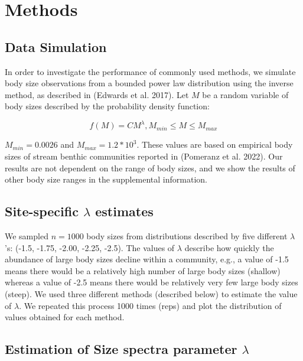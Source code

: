 \documentclass[
]{article}
\begin{document}
\hypertarget{methods}{%
\section{Methods}\label{methods}}

\hypertarget{data-simulation}{%
\subsection{Data Simulation}\label{data-simulation}}

In order to investigate the performance of commonly used methods, we
simulate body size observations from a bounded power law distribution
using the inverse method, as described in (Edwards et al. 2017). Let
\(M\) be a random variable of body sizes described by the probability
density function:

\[f(M) = CM^\lambda, M_{min} \le M \le M_{max}\]

\(M_{min} = 0.0026\) and \(M_{max} = 1.2 *10^3\). These values are based
on empirical body sizes of stream benthic communities reported in
(Pomeranz et al. 2022). Our results are not dependent on the range of
body sizes, and we show the results of other body size ranges in the
supplemental information.

\hypertarget{site-specific-lambda-estimates}{%
\subsection{\texorpdfstring{Site-specific \(\lambda\)
estimates}{Site-specific \textbackslash lambda estimates}}\label{site-specific-lambda-estimates}}

We sampled \(n = 1000\) body sizes from distributions described by five
different \(\lambda\)'s: (-1.5, -1.75, -2.00, -2.25, -2.5). The values
of \(\lambda\) describe how quickly the abundance of large body sizes
decline within a community, e.g., a value of -1.5 means there would be a
relatively high number of large body sizes (shallow) whereas a value of
-2.5 means there would be relatively very few large body sizes (steep).
We used three different methods (described below) to estimate the value
of \(\lambda\). We repeated this process 1000 times (reps) and plot the
distribution of values obtained for each method.

\hypertarget{estimation-of-size-spectra-parameter-lambda}{%
\subsection{\texorpdfstring{Estimation of Size spectra parameter
\(\lambda\)}{Estimation of Size spectra parameter \textbackslash lambda}}\label{estimation-of-size-spectra-parameter-lambda}}
\end{document}
